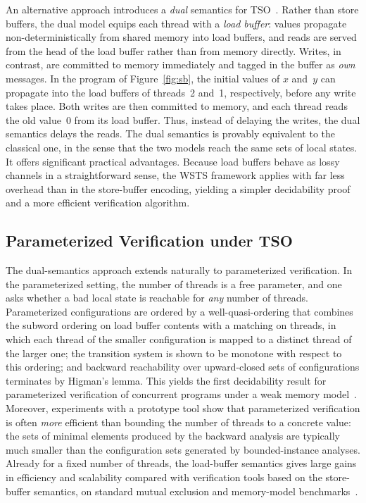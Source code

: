 An alternative approach introduces a \emph{dual} semantics for
TSO~\cite{AABN16,AABN18}. Rather than store buffers, the dual model
equips each thread with a \emph{load buffer}: values propagate
non-deterministically from shared memory into load buffers, and reads are
served from the head of the load buffer rather than from memory directly.
Writes, in contrast, are committed to memory immediately and tagged in the
buffer as \emph{own} messages. In the program of Figure~\ref{fig:sb}, the
initial values of $x$ and~$y$ can propagate into the load buffers of
threads~2 and~1, respectively, before any write takes place. Both writes are
then committed to memory, and each thread reads the old value~$0$ from its
load buffer. Thus, instead of delaying the writes, the dual semantics delays
the reads. The dual semantics is provably equivalent to the classical one, in
the sense that the two models reach the same sets of local states. It offers
significant practical advantages. Because load buffers behave as lossy channels in a
straightforward sense, the WSTS framework applies with far less overhead than
in the store-buffer encoding, yielding a simpler decidability proof and a more
efficient verification algorithm.

\subsection{Parameterized Verification under TSO}

The dual-semantics approach extends naturally to parameterized verification.
In the parameterized setting, the number of threads is a free parameter, and
one asks whether a bad local state is reachable for \emph{any} number of
threads. Parameterized configurations are ordered by a well-quasi-ordering
that combines the subword ordering on load buffer contents with a matching on
threads, in which each thread of the smaller configuration is mapped to a
distinct thread of the larger one; the transition system is shown to be
monotone with respect to this ordering; and backward reachability over
upward-closed sets of configurations terminates by Higman's lemma. This yields
the first decidability result for parameterized verification of concurrent
programs under a weak memory model~\cite{AABN16,AABN18}. Moreover, experiments
with a prototype tool show that parameterized verification is often
\emph{more} efficient than bounding the number of threads to a concrete
value: the sets of minimal elements produced by the backward analysis are
typically much smaller than the configuration sets generated by
bounded-instance analyses. Already for a fixed number of threads, the
load-buffer semantics gives large gains in efficiency and scalability compared
with verification tools based on the store-buffer semantics, on standard mutual
exclusion and memory-model benchmarks~\cite{AABN18}.

